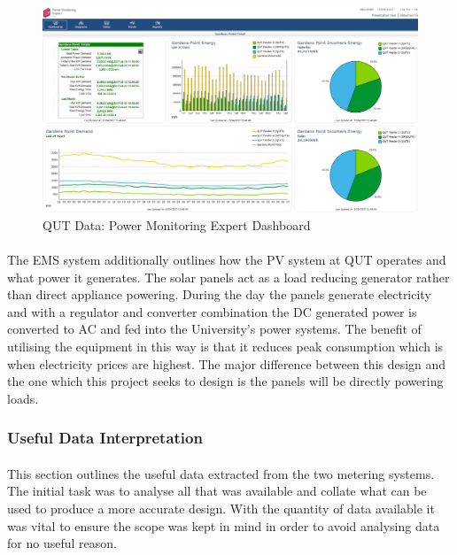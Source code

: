 \begin{figure}[H]
	\hfill\includegraphics[width = 150mm]{images/metering/pme/summary-dashboard}\hspace*{\fill}
	\caption{QUT Data: Power Monitoring Expert Dashboard} 
	\label{fig:qut-summary-dashboard}
\end{figure}

\paragraph{}
The EMS system additionally outlines how the PV system at QUT operates and what power it generates. The solar panels act as a load reducing generator rather than direct appliance powering. During the day the panels generate electricity and with a regulator and converter combination the DC generated power is converted to AC and fed into the University's power systems. The benefit of utilising the equipment in this way is that it reduces peak consumption which is when electricity prices are highest. The major difference between this design and the one which this project seeks to design is the panels will be directly powering loads.

\subsubsection{Useful Data Interpretation}

\paragraph{}
This section outlines the useful data extracted from the two metering systems. The initial task was to analyse all that was available and collate what can be used to produce a more accurate design. With the quantity of data available it was vital to ensure the scope was kept in mind in order to avoid analysing data for no useful reason. 

